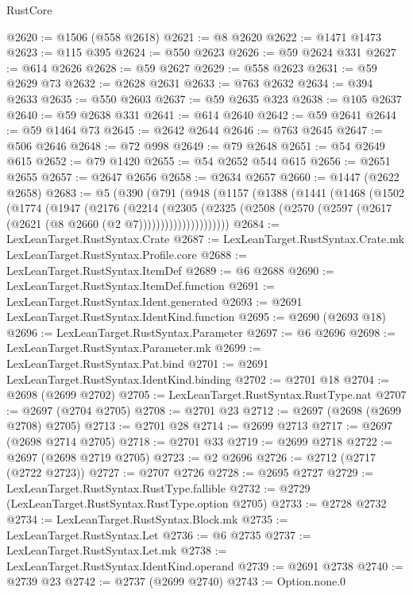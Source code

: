 \begin{lexlean}{RustCore}
\begin{coremodule}
@2620 := @1506 (@558 @2618)
@2621 := @8 @2620
@2622 := @1471 @1473
@2623 := @115 @395
@2624 := @550 @2623
@2626 := @59 @2624 @331
@2627 := @614 @2626
@2628 := @59 @2627
@2629 := @558 @2623
@2631 := @59 @2629 @73
@2632 := @2628 @2631
@2633 := @763 @2632
@2634 := @394 @2633
@2635 := @550 @2603
@2637 := @59 @2635 @323
@2638 := @105 @2637
@2640 := @59 @2638 @331
@2641 := @614 @2640
@2642 := @59 @2641
@2644 := @59 @1464 @73
@2645 := @2642 @2644
@2646 := @763 @2645
@2647 := @506 @2646
@2648 := @72 @998
@2649 := @79 @2648
@2651 := @54 @2649 @615
@2652 := @79 @1420
@2655 := @54 @2652 @544 @615
@2656 := @2651 @2655
@2657 := @2647 @2656
@2658 := @2634 @2657
@2660 := @1447 (@2622 @2658)
@2683 := @5
    (@390
      (@791
        (@948
          (@1157
            (@1388
              (@1441
                (@1468
                  (@1502
                    (@1774
                      (@1947
                        (@2176
                          (@2214
                            (@2305
                              (@2325
                                (@2508
                                  (@2570 (@2597 (@2617 (@2621 (@8 @2660 (@2 @7)))))))))))))))))))))
@2684 := LexLeanTarget.RustSyntax.Crate
@2687 := LexLeanTarget.RustSyntax.Crate.mk LexLeanTarget.RustSyntax.Profile.core
@2688 := LexLeanTarget.RustSyntax.ItemDef
@2689 := @6 @2688
@2690 := LexLeanTarget.RustSyntax.ItemDef.function
@2691 := LexLeanTarget.RustSyntax.Ident.generated
@2693 := @2691 LexLeanTarget.RustSyntax.IdentKind.function
@2695 := @2690 (@2693 @18)
@2696 := LexLeanTarget.RustSyntax.Parameter
@2697 := @6 @2696
@2698 := LexLeanTarget.RustSyntax.Parameter.mk
@2699 := LexLeanTarget.RustSyntax.Pat.bind
@2701 := @2691 LexLeanTarget.RustSyntax.IdentKind.binding
@2702 := @2701 @18
@2704 := @2698 (@2699 @2702)
@2705 := LexLeanTarget.RustSyntax.RustType.nat
@2707 := @2697 (@2704 @2705)
@2708 := @2701 @23
@2712 := @2697 (@2698 (@2699 @2708) @2705)
@2713 := @2701 @28
@2714 := @2699 @2713
@2717 := @2697 (@2698 @2714 @2705)
@2718 := @2701 @33
@2719 := @2699 @2718
@2722 := @2697 (@2698 @2719 @2705)
@2723 := @2 @2696
@2726 := @2712 (@2717 (@2722 @2723))
@2727 := @2707 @2726
@2728 := @2695 @2727
@2729 := LexLeanTarget.RustSyntax.RustType.fallible
@2732 := @2729 (LexLeanTarget.RustSyntax.RustType.option @2705)
@2733 := @2728 @2732
@2734 := LexLeanTarget.RustSyntax.Block.mk
@2735 := LexLeanTarget.RustSyntax.Let
@2736 := @6 @2735
@2737 := LexLeanTarget.RustSyntax.Let.mk
@2738 := LexLeanTarget.RustSyntax.IdentKind.operand
@2739 := @2691 @2738
@2740 := @2739 @23
@2742 := @2737 (@2699 @2740)
@2743 := Option.none.{0}

\end{coremodule}
\end{lexlean}
